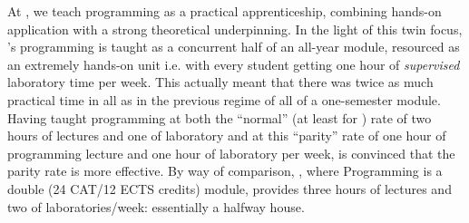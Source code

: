 \documentclass[conference,compsoc]{IEEEtran}
\begin{document}
At \Bath, we  teach programming as a practical apprenticeship, combining hands-on application with a strong theoretical underpinning. 
In  the  light of this twin focus, \BathM's programming is taught as a concurrent half of an all-year module, resourced as an extremely hands-on unit i.e. with every student getting one hour of \emph{supervised} laboratory time per week. This actually meant that there was twice as much practical time in all as in the previous regime of all of a one-semester module. 
Having taught programming at both the ``normal'' (at least for \Bath) rate of two hours of lectures and one of laboratory and at this ``parity'' rate of one hour of programming lecture and one hour of laboratory per week, \JHD{} is convinced that the parity rate is more effective.
 By way of comparison, \BathC, where Programming is a double  (24 CAT/12 ECTS credits) module, provides three hours of lectures and two of laboratories/week: essentially a halfway house.
\end{document}
